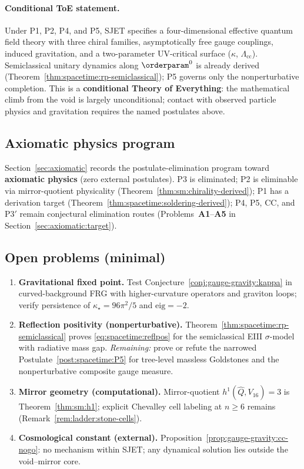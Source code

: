 \paragraph{Conditional ToE statement.}
Under P1, P2, P4, and P5, SJET specifies a four-dimensional effective
quantum field theory with three chiral families, asymptotically free gauge
couplings, induced gravitation, and a two-parameter UV-critical surface
($\kappa$, $\Lambda_{\mathrm{cc}}$). Semiclassical unitary dynamics along
$\orderparam^0$ is already derived
(Theorem~\ref{thm:spacetime:rp-semiclassical}); P5 governs only the
nonperturbative completion. This is a \textbf{conditional Theory of
Everything}: the mathematical climb from the void is largely unconditional;
contact with observed particle physics and gravitation requires the named
postulates above.

\subsection{Axiomatic physics program}
\label{sec:conclusions:axiomatic}

Section~\ref{sec:axiomatic} records the postulate-elimination program toward
\textbf{axiomatic physics} (zero external postulates). P3 is eliminated;
P2 is eliminable via mirror-quotient physicality
(Theorem~\ref{thm:sm:chirality-derived}); P1 has a derivation target
(Theorem~\ref{thm:spacetime:soldering-derived}); P4, P5, CC, and P3$'$ remain
conjectural elimination routes (Problems~\textbf{A1}--\textbf{A5} in
Section~\ref{sec:axiomatic:target}).

\subsection{Open problems (minimal)}
\label{sec:conclusions:open}

\begin{enumerate}[label=\textbf{O\arabic*.},leftmargin=*]
  \item \textbf{Gravitational fixed point.}
    Test Conjecture~\ref{conj:gauge-gravity:kappa} in curved-background FRG
    with higher-curvature operators and graviton loops; verify persistence
    of $\kappa_\star=96\pi^2/5$ and $\mathrm{eig}=-2$.
  \item \textbf{Reflection positivity (nonperturbative).}
    Theorem~\ref{thm:spacetime:rp-semiclassical} proves
    \eqref{eq:spacetime:reflpos} for the semiclassical EIII $\sigma$-model
    with radiative mass gap. \emph{Remaining:} prove or refute the narrowed
    Postulate~\ref{post:spacetime:P5} for tree-level massless Goldstones and
    the nonperturbative composite gauge measure.
  \item \textbf{Mirror geometry (computational).}
    Mirror-quotient $h^1(\hat Q,V_{16})=3$ is Theorem~\ref{thm:sm:h1}; explicit
    Chevalley cell labeling at $n\geq6$ remains
    (Remark~\ref{rem:ladder:stone-cells}).
  \item \textbf{Cosmological constant (external).}
    Proposition~\ref{prop:gauge-gravity:cc-nogo}: no mechanism within SJET;
    any dynamical solution lies outside the void--mirror core.
\end{enumerate}